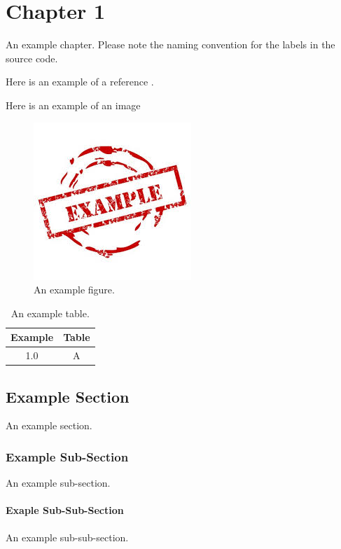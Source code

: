 \chapter{Chapter 1}
\label{ch.chapter1}

An example chapter. Please note the naming convention for the labels in the source code.
\par \noindent
Here is an example of a reference \cite{bib.example}.
\par \noindent
Here is an example of an image
\begin{figure}[h]
    \centering
    \includegraphics[scale=0.4]{figures/example.jpg}
    \caption{An example figure.}
    \label{fig.example}
\end{figure}

\begin{table}[h]
    \centering
    \begin{tabular}{|c|c|}
    \bf{Example} & \bf{Table} \\
    \hline
    1.0 & A
    \end{tabular}
    \caption{An example table.}
    \label{tbl.example}
\end{table}

\section{Example Section}
\label{sc.example}

An example section.

\subsection{Example Sub-Section}
\label{sc.example.sub}

An example sub-section.

\subsubsection{Exaple Sub-Sub-Section}
\label{sc.example.sub.sub_sub}

An example sub-sub-section.
